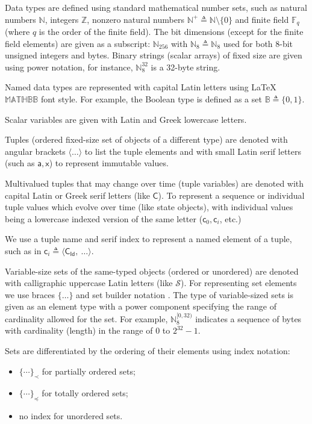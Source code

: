 \documentclass[a4paper]{article}
\begin{document}
\begin{multicols}{2}
Data types are defined using standard mathematical number sets, such as
natural numbers $\mathbb{N}$, integers $\mathbb{Z}$,
nonzero natural numbers $\mathbb{N}^+ \triangleq \mathbb{N}\setminus\{0\}$
and finite field $\mathbb{F}_q$ (where $q$ is the order of the finite field).
The bit dimensions (except for the finite field elements) are given as a subscript:
$\mathbb{N}_{256}$ with $\mathbb{N}_8 \triangleq \mathbb{N}_8$ used for both 8-bit
unsigned integers and bytes.
Binary strings (scalar arrays) of fixed size are given using power notation,
for instance, $\mathbb{N}_8^{32}$ is a 32-byte string.

Named data types are represented with capital Latin letters using \LaTeX\ $\mathbb{MATHBB}$ font style.
For example, the Boolean type is defined as a set $\mathbb{B} \triangleq \{0, 1\}$.

Scalar variables are given with Latin and Greek lowercase letters.

Tuples (ordered fixed-size set of objects of a different type) are denoted with angular brackets
$\langle \ldots \rangle$ to list the tuple elements
and with small Latin serif letters (such as $\mathsf{a}, \mathsf{x}$) to represent immutable values.

Multivalued tuples that may change over time (tuple variables) are denoted
with capital Latin or Greek serif letters (like $\mathsf{C}$). To represent
a sequence or individual tuple values which evolve over time (like state objects),
with individual values being a lowercase indexed version of the same letter
($\mathsf{c}_0, \mathsf{c}_i$, etc.)

We use a tuple name and serif index to represent a named element of a tuple,
such as in $\mathsf{c}_i \triangleq \langle \mathsf{C_{Id}}, \ \ldots \rangle$.

Variable-size sets of the same-typed objects (ordered or unordered) are denoted with
calligraphic uppercase Latin letters (like $\mathcal{S}$).
For representing set elements we use braces $\{\ldots\}$ and set builder notation \cite{setbuilder}.
The type of variable-sized sets is given as an element type with a power component
specifying the range of cardinality allowed for the set.
For example, $\mathbb{N}_8^{[0, 32)}$ indicates a sequence of bytes with cardinality (length)
in the range of $0$ to $2^{32} - 1$.

Sets are differentiated by the ordering of their elements using index notation:
\begin{itemize}
    \item $\{ \cdots \}_\prec$ for partially ordered sets;
    \item $\{ \cdots \}_\preceq$ for totally ordered sets;
    \item no index for unordered sets.
\end{itemize}


\end{multicols}
\end{document}
